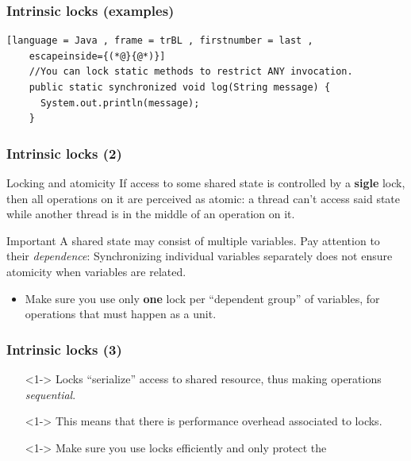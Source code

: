 \documentclass[xcolor={dvipsnames,svgnames},aspectratio=169]{beamer}
\begin{document}
\begin{frame}[fragile]
  \frametitle{Intrinsic locks (examples)}

  \begin{lstlisting}[language = Java , frame = trBL , firstnumber = last ,
    escapeinside={(*@}{@*)}]
    //You can lock static methods to restrict ANY invocation.
    public static synchronized void log(String message) {
      System.out.println(message);
    }
  \end{lstlisting}

\end{frame}

\begin{frame}[fragile]
  \frametitle{Intrinsic locks (2)}
  \begin{block}{Locking and atomicity}
    If access to some shared state is controlled by a \textbf{sigle} lock, then
    all operations on it are perceived as atomic: a thread can't access said
    state while another thread is in the middle of an operation on it.
  \end{block}

  \begin{block}{Important}
    A shared state may consist of multiple variables. Pay attention to their
    \emph{dependence}: Synchronizing individual variables separately does not
    ensure atomicity when variables are related.
  \end{block}

  \begin{itemize}
  \item<2->[\faUserInjured] Make sure you use only \textbf{one} lock per
    ``dependent group'' of variables, for operations that must happen as a unit.
  \end{itemize}
\end{frame}

\begin{frame}[fragile]
  \frametitle{Intrinsic locks (3)}

  \begin{itemize}
  \item[\faBook]<1-> Locks ``serialize'' access to shared resource, thus making
    operations \emph{sequential}.
  \item[\faUserInjured]<1-> This means that there is performance overhead
    associated to locks.
  \item[\faBook]<1-> Make sure you use locks efficiently and only protect the 
  \end{itemize}
\end{frame}
\end{document}

